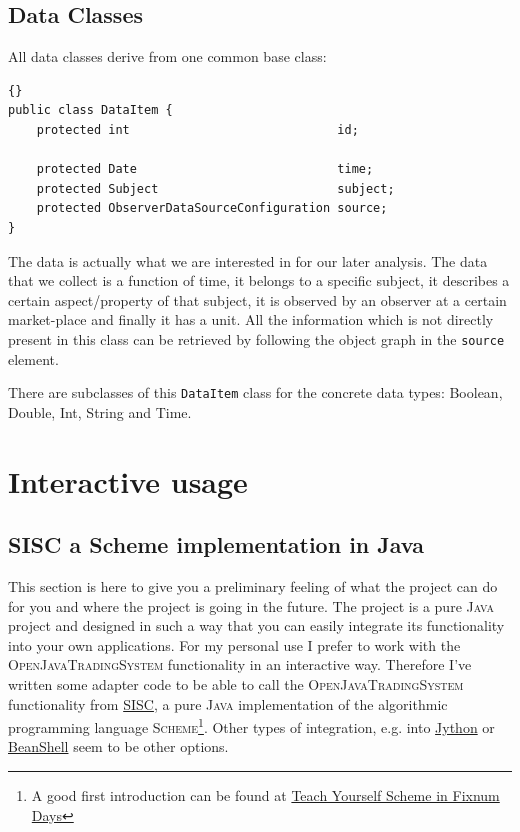 \documentclass[a4paper,fleqn]{article}
\newcommand{\name}[1]{\textsc{#1}}
\newcommand{\OpenJavaTradingSystem}{\name{OpenJavaTradingSystem}}
\newcommand{\Java}{\name{Java}}
\newcommand{\Scheme}{\name{Scheme}}
\begin{document}
\subsection{Data Classes}

\noindent All data classes derive from one common base class:
\begin{lstlisting}[frame=trbl]{}
public class DataItem {
	protected int                             id;

	protected Date                            time;
	protected Subject                         subject;
	protected ObserverDataSourceConfiguration source;
}
\end{lstlisting}
The data is actually what we are interested in for our later
analysis. The data that we collect is a function of time, it belongs
to a specific subject, it describes a certain aspect/property of that
subject, it is observed by an observer at a certain market-place and
finally it has a unit. All the information which is not directly
present in this class can be retrieved by following the object graph
in the \lstinline!source! element.

There are subclasses of this \lstinline!DataItem! class for the
concrete data types: Boolean, Double, Int, String and Time.


\section{Interactive usage}
\subsection{SISC a Scheme implementation in Java}

\noindent This section is here to give you a preliminary feeling of
what the project can do for you and where the project is going in the
future. The project is a pure \Java{} project and designed in such a
way that you can easily integrate its functionality into your own
applications. For my personal use I prefer to work with the
\OpenJavaTradingSystem{} functionality in an interactive
way. Therefore I've written some adapter code to be able to call the
\OpenJavaTradingSystem{} functionality from
\href{http://sisc.sourceforge.net/}{SISC}, a pure \Java{}
implementation of the algorithmic programming language
\Scheme{}\footnote{A good first introduction can be found at
  \href{http://www.ccs.neu.edu/home/dorai/t-y-scheme/t-y-scheme.html}{Teach Yourself Scheme in Fixnum Days}}. 
Other types of integration, e.g. into
\href{http://www.jython.org/}{Jython} or
\href{http://www.beanshell.org/}{BeanShell} seem to be other options.
\end{document}
